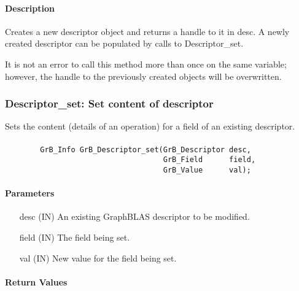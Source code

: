 \paragraph{Description}

Creates a new descriptor object and returns a handle to it in {\sf desc}.
A newly created descriptor can be populated by calls to {\sf Descriptor\_set}.

It is not an error to call this method more than once on the same variable;  
however, the handle to the previously created objects will be overwritten. 


\subsubsection{{\sf Descriptor\_set}: Set content of descriptor}

Sets the content (details of an operation) for a field of an existing
descriptor.

\paragraph{\syntax}

\begin{verbatim}
        GrB_Info GrB_Descriptor_set(GrB_Descriptor desc,
                                    GrB_Field      field,
                                    GrB_Value      val);
\end{verbatim}

\paragraph{Parameters}

\begin{itemize}[leftmargin=1.1in]
    \item[{\sf desc}]  ({\sf IN}) An existing GraphBLAS descriptor to be modified.
    \item[{\sf field}] ({\sf IN}) The field being set.
    \item[{\sf val}]   ({\sf IN}) New value for the field being set.
\end{itemize}

\paragraph{Return Values}

